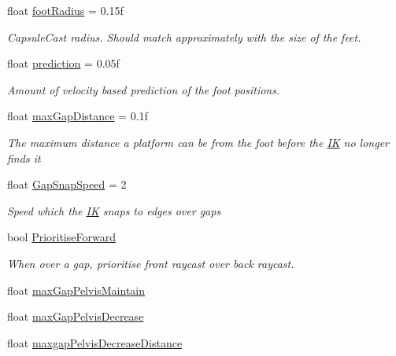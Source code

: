 \begin{DoxyCompactItemize}
float \mbox{\hyperlink{class_root_motion_1_1_final_i_k_1_1_grounding_a439605a5f72ba26878e5555ae166a955}{foot\+Radius}} = 0.\+15f
\begin{DoxyCompactList}\small\item\em Capsule\+Cast radius. Should match approximately with the size of the feet. \end{DoxyCompactList}\item 
float \mbox{\hyperlink{class_root_motion_1_1_final_i_k_1_1_grounding_a07790bb79534508da0f58b6b5ab9c540}{prediction}} = 0.\+05f
\begin{DoxyCompactList}\small\item\em Amount of velocity based prediction of the foot positions. \end{DoxyCompactList}\item 
float \mbox{\hyperlink{class_root_motion_1_1_final_i_k_1_1_grounding_aff75737919b95d70d3333f81856f60bd}{max\+Gap\+Distance}} = 0.\+1f
\begin{DoxyCompactList}\small\item\em The maximum distance a platform can be from the foot before the \mbox{\hyperlink{class_root_motion_1_1_final_i_k_1_1_i_k}{IK}} no longer finds it \end{DoxyCompactList}\item 
float \mbox{\hyperlink{class_root_motion_1_1_final_i_k_1_1_grounding_ad11a6a934394009365768190e532dc66}{Gap\+Snap\+Speed}} = 2
\begin{DoxyCompactList}\small\item\em Speed which the \mbox{\hyperlink{class_root_motion_1_1_final_i_k_1_1_i_k}{IK}} snaps to edges over gaps \end{DoxyCompactList}\item 
bool \mbox{\hyperlink{class_root_motion_1_1_final_i_k_1_1_grounding_af335524c0dc2315df6c7259c9e3bf55e}{Prioritise\+Forward}}
\begin{DoxyCompactList}\small\item\em When over a gap, prioritise front raycast over back raycast. \end{DoxyCompactList}\item 
float \mbox{\hyperlink{class_root_motion_1_1_final_i_k_1_1_grounding_aeff923fa4e969044d47263ce6209cb0d}{max\+Gap\+Pelvis\+Maintain}}
\item 
float \mbox{\hyperlink{class_root_motion_1_1_final_i_k_1_1_grounding_a2dc2fdca0e421f52d2f8ecc43593c5b5}{max\+Gap\+Pelvis\+Decrease}}
\item 
float \mbox{\hyperlink{class_root_motion_1_1_final_i_k_1_1_grounding_a989f4b5b4a01911f782a1a23df333a1d}{maxgap\+Pelvis\+Decrease\+Distance}}

\end{DoxyCompactItemize}
